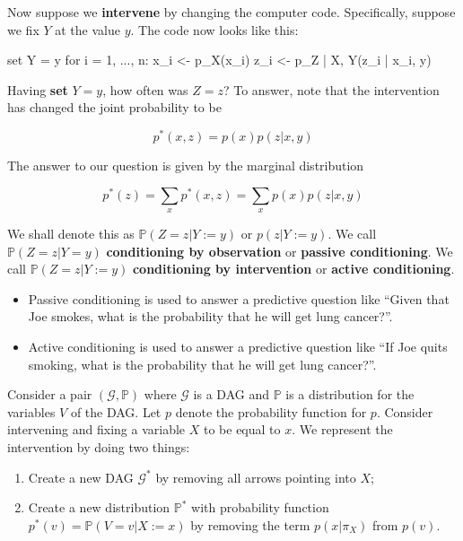 Now suppose we \textbf{intervene} by changing the computer code.
Specifically, suppose we fix \(Y\) at the value \(y\). The code now
looks like this:

\begin{console}
set Y = y
for i = 1, ..., n:
  x_i <- p_X(x_i)
  z_i <- p_{Z | X, Y}(z_i | x_i, y)
\end{console}

Having \textbf{set} \(Y = y\), how often was \(Z = z\)? To answer, note
that the intervention has changed the joint probability to be

\[ p^*(x, z) = p(x) p(z | x, y) \]

The answer to our question is given by the marginal distribution

\[ p^*(z) = \sum_x p^*(x, z) = \sum_x p(x) p(z | x, y) \]

We shall denote this as \(\mathbb{P}(Z = z | Y := y)\) or
\(p(z | Y := y)\). We call \(\mathbb{P}(Z = z | Y = y)\)
\textbf{conditioning by observation} or \textbf{passive conditioning}.
We call \(\mathbb{P}(Z = z | Y := y)\) \textbf{conditioning by
intervention} or \textbf{active conditioning}.

\begin{itemize}[tightlist]
\item
  Passive conditioning is used to answer a predictive question like
  ``Given that Joe smokes, what is the probability that he will get lung
  cancer?''.
\item
  Active conditioning is used to answer a predictive question like ``If
  Joe quits smoking, what is the probability that he will get lung
  cancer?''.
\end{itemize}

Consider a pair \((\mathcal{G}, \mathbb{P})\) where \(\mathcal{G}\) is a
DAG and \(\mathbb{P}\) is a distribution for the variables \(V\) of the
DAG. Let \(p\) denote the probability function for \(p\). Consider
intervening and fixing a variable \(X\) to be equal to \(x\). We
represent the intervention by doing two things:

\begin{enumerate}[tightlist,label={\arabic*.}]
\item
  Create a new DAG \(\mathcal{G}^*\) by removing all arrows pointing
  into \(X\);
\item
  Create a new distribution \(\mathbb{P}^*\) with probability function
  \(p^*(v) = \mathbb{P}(V = v | X := x)\) by removing the term
  \(p(x | \pi_X)\) from \(p(v)\).
\end{enumerate}

